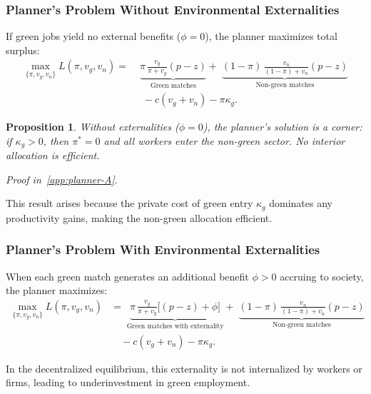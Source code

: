 \documentclass[preprint,12pt]{elsarticle}
\newtheorem{proposition}{Proposition}
\begin{document}
\subsubsection{Planner’s Problem Without Environmental Externalities}

If green jobs yield no external benefits ($\phi=0$), the planner maximizes total surplus:
\begin{equation}
\begin{split}
\max_{\{\pi,v_g,v_n\}} 
L(\pi,v_g,v_n)
=\; &\underbrace{\pi\,\frac{v_g}{\pi+v_g}(p-z)}_{\text{Green matches}}
+\;\underbrace{(1-\pi)\,\frac{v_n}{(1-\pi)+v_n}(p-z)}_{\text{Non-green matches}} \\
&\; - c(v_g+v_n) - \pi \kappa_g.
\end{split}
\label{eq:planner-obj}
\end{equation}


\begin{proposition}\label{prop:efficiency}
Without externalities ($\phi=0$), the planner’s solution is a corner: if $\kappa_g>0$, then $\pi^*=0$ and all workers enter the non-green sector. No interior allocation is efficient.
\end{proposition}

\textit{Proof in~\ref{app:planner-A}}.  

\noindent This result arises because the private cost of green entry $\kappa_g$ dominates any productivity gains, making the non-green allocation efficient.

\subsubsection{Planner’s Problem With Environmental Externalities}

When each green match generates an additional benefit $\phi>0$ accruing to society, the planner maximizes:
\begin{align}
\max_{\{\pi,v_g,v_n\}} 
L(\pi,v_g,v_n)
&=\; \underbrace{\pi\,\frac{v_g}{\pi+v_g}\bigl[(p-z)+\phi\bigr]}_{\text{Green matches with externality}}
+\;\underbrace{(1-\pi)\,\frac{v_n}{(1-\pi)+v_n}(p-z)}_{\text{Non-green matches}} \nonumber\\
&\quad - c(v_g+v_n) - \pi \kappa_g.
\label{eq:planner-obj-ext}
\end{align}

In the decentralized equilibrium, this externality is not internalized by workers or firms, leading to underinvestment in green employment.
\end{document}
